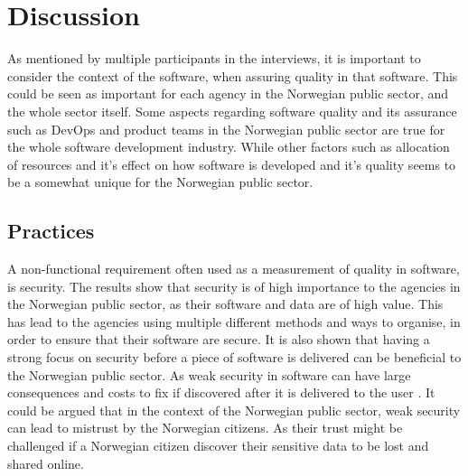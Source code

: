 \chapter{Discussion}
As mentioned by multiple participants in the interviews, it is important to consider the context of the software, when assuring quality in that software. This could be seen as important for each agency in the Norwegian public sector, and the whole sector itself. Some aspects regarding software quality and its assurance such as DevOps and product teams in the Norwegian public sector are true for the whole software development industry. While other factors such as allocation of resources and it's effect on how software is developed and it's quality seems to be a somewhat unique for the Norwegian public sector.




\section{Practices}
A non-functional requirement often used as a measurement of quality in software, is security. The results show that security is of high importance to the agencies in the Norwegian public sector, as their software and data are of high value. This has lead to the agencies using multiple different methods and ways to organise, in order to ensure that their software are secure. It is also shown that having a strong focus on security before a piece of software is delivered can be beneficial to the Norwegian public sector. As weak security in software can have large consequences and costs to fix if discovered after it is delivered to the user \cite{csw_2011}. It could be argued that in the context of the Norwegian public sector, weak security can lead to mistrust by the Norwegian citizens. As their trust might be challenged if a Norwegian citizen discover their sensitive data to be lost and shared online.

